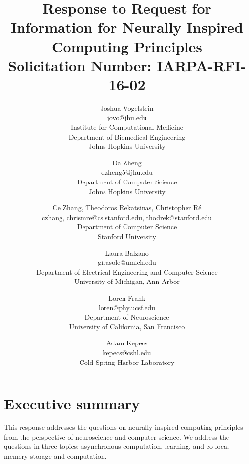 \documentclass[12pt]{report}
\begin{document}
\title{
\LARGE \textbf{Response to Request for Information for Neurally Inspired Computing Principles} \\
Solicitation Number: IARPA-RFI-16-02
}

\date{}

\author{
{Joshua Vogelstein} 	\\
jovo@jhu.edu		\\
Institute for Computational Medicine 	\\
Department of Biomedical Engineering 	\\
Johns Hopkins University
\and
{Da Zheng}	\\
dzheng5@jhu.edu		\\
Department of Computer Science \\
Johns Hopkins University
\and
{Ce Zhang, Theodoros Rekatsinas, Christopher R\'e}	\\
{czhang, chrismre}@cs.stanford.edu, thodrek@stanford.edu	\\
Department of Computer Science		\\
Stanford University
\and
{Laura Balzano}		\\
girasole@umich.edu	\\
Department of Electrical Engineering and Computer Science	\\
University of Michigan, Ann Arbor
\and
{Loren Frank}			\\
loren@phy.ucsf.edu		\\
Department of Neuroscience	\\
University of California, San Francisco
\and
{Adam Kepecs}			\\
kepecs@cshl.edu		\\
Cold Spring Harbor Laboratory
} %

\maketitle
\newpage

\sectionfont{\scshape}


\section*{Executive summary}
This response addresses the questions on neurally inspired computing principles
from the perspective of neuroscience and computer science. We address
the questions in three topics: asynchronous computation, learning, and co-local
memory storage and computation.
\end{document}
